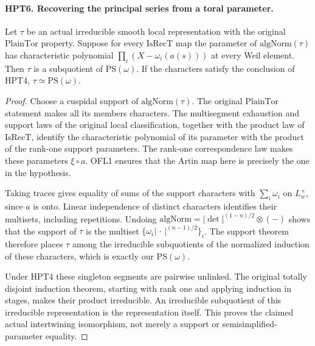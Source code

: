 \documentclass[11pt,a4paper]{article}
\numberwithin{equation}{section}
\theoremstyle{remark}\newtheorem{remark}[theorem]{Remark}
\begin{document}
\paragraph{HPT6. Recovering the principal series from a toral parameter.}
\label{claim:HPT6}
Let $\tau$ be an actual irreducible smooth local representation with
the original $\mathrm{PlainTor}$ property.  Suppose for every
$\mathrm{IsRecT}$ map the parameter of $\mathrm{algNorm}(\tau)$
has characteristic polynomial $\prod_i(X-\omega_i(a(s)))$ at
every Weil element.  Then $\tau$ is a subquotient of
$\mathrm{PS}(\omega)$.  If the characters satisfy the conclusion
of HPT4, $\tau\simeq\mathrm{PS}(\omega)$.
\begin{proof}
Choose a cuspidal support of $\mathrm{algNorm}(\tau)$.
The original $\mathrm{PlainTor}$ statement makes all its members
characters.  The multisegment exhaustion and support laws of the
original local classification, together with the product law of
$\mathrm{IsRecT}$, identify the characteristic polynomial of its
parameter with the product of the rank-one support parameters.
The rank-one correspondence law makes these parameters
$\xi\circ a$.  OFL1 ensures that the Artin map here is precisely
the one in the hypothesis.

Taking traces gives equality of sums of the support characters
with $\sum_i\omega_i$ on $L_w^\times$, since $a$ is onto.
Linear independence of distinct characters identifies their
multisets, including repetitions.  Undoing
$\mathrm{algNorm}=|\det|^{(1-n)/2}\otimes(-)$ shows that the
support of $\tau$ is the multiset
$\{\omega_i|\,\cdot\,|^{(n-1)/2}\}_i$.  The support theorem
therefore places $\tau$ among the irreducible subquotients of
the normalized induction of these characters, which is exactly
our $\mathrm{PS}(\omega)$.

Under HPT4 these singleton segments are pairwise unlinked.
The original totally disjoint induction theorem, starting with
rank one and applying induction in stages, makes their product
irreducible.  An irreducible subquotient of this irreducible
representation is the representation itself.  This proves the
claimed actual intertwining isomorphism, not merely a support
or semisimplified-parameter equality.
\end{proof}

\end{document}
